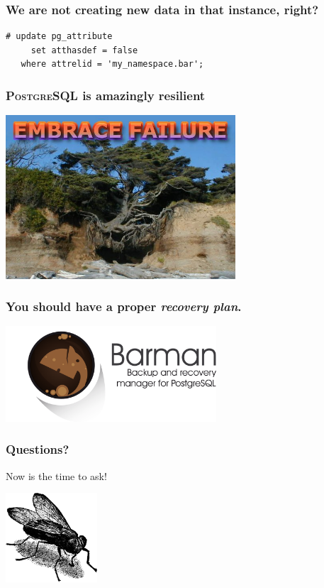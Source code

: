 \documentclass{beamer}
\begin{document}
\begin{frame}[fragile]
  \frametitle{We are not creating new data in that instance, right?}

  \begin{verbatim}
# update pg_attribute
     set atthasdef = false
   where attrelid = 'my_namespace.bar';
  \end{verbatim}
\end{frame}

\begin{frame}
  \frametitle{\textsc{PostgreSQL} is amazingly resilient}

  \begin{center}
    \includegraphics[height=2.4in]{resilience_logo.jpg}
  \end{center}
\end{frame}

\begin{frame}
  \frametitle{You should have a proper \textit{recovery plan}.}

  
  \begin{center}
    \includegraphics[height=1.4in]{pgbarman.png}
  \end{center}
\end{frame}

\begin{frame}
  \frametitle{Questions?}

\begin{center}
  Now is the time to ask!
  \vfill

  \includegraphics[height=9em]{fly.png}
\end{center}
\end{frame}
\end{document}
